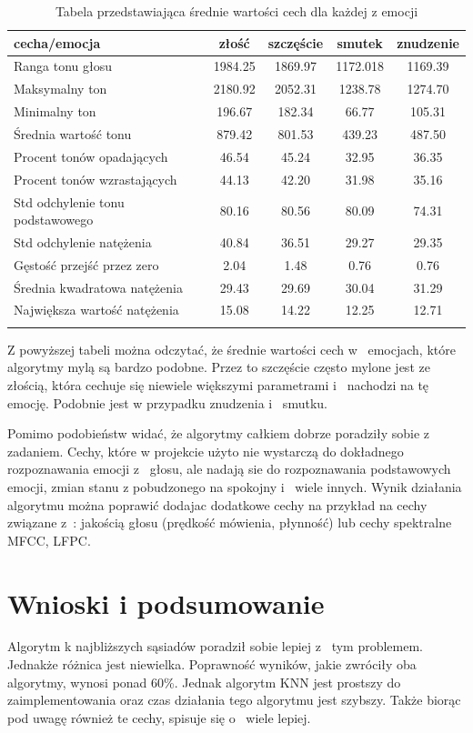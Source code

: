 \documentclass[declaration,shortabstract]{iithesis}
\begin{document}
\begin{table}[p]
\caption{Tabela przedstawiająca średnie wartości cech dla każdej z emocji}
  \begin{tabular}{|l|c|c|c|c|}
    \hline
    cecha/emocja & złość & szczęście & smutek & znudzenie \\ \hline
    Ranga tonu głosu & 1984.25 & 1869.97 & 1172.018 & 1169.39 \\ \hline
    Maksymalny ton & 2180.92 & 2052.31 & 1238.78 & 1274.70\\ \hline
    Minimalny ton & 196.67 & 182.34 & 66.77 & 105.31 \\ \hline
    Średnia wartość tonu & 879.42 & 801.53 & 439.23 & 487.50\\ \hline
	Procent tonów opadających & 46.54 & 45.24 & 32.95 & 36.35 \\ \hline
	Procent tonów wzrastających & 44.13 & 42.20 & 31.98 & 35.16 \\ \hline
	Std odchylenie tonu podstawowego & 80.16 & 80.56 & 80.09 & 74.31 \\ \hline
	Std odchylenie natężenia & 40.84 & 36.51 & 29.27 & 29.35 \\ \hline
	Gęstość przejść przez zero & 2.04 & 1.48 & 0.76 & 0.76 \\ \hline
	Średnia kwadratowa natężenia & 29.43 & 29.69 & 30.04 & 31.29 \\ \hline
	Największa wartość natężenia & 15.08 & 14.22 & 12.25 & 12.71 \\ \hline
	\label{sr_war}
  \end{tabular}
\end{table}

Z powyższej tabeli można odczytać, że średnie wartości cech w~ emocjach, które algorytmy mylą są bardzo podobne. Przez to szczęście często mylone jest ze złością, która cechuje się niewiele większymi parametrami i~ nachodzi na tę emocję. Podobnie jest w przypadku znudzenia i~ smutku. 

Pomimo podobieństw widać, że algorytmy całkiem dobrze poradziły sobie z zadaniem. Cechy, które w projekcie użyto nie wystarczą do dokładnego rozpoznawania emocji z~ głosu, ale nadają sie do rozpoznawania podstawowych emocji, zmian stanu z pobudzonego na spokojny i~ wiele innych. Wynik działania algorytmu można poprawić dodajac dodatkowe cechy na przykład na cechy związane z~: jakością głosu (prędkość mówienia, płynność) lub cechy spektralne MFCC, LFPC. 

\chapter{Wnioski i podsumowanie}
Algorytm k najbliższych sąsiadów poradził sobie lepiej z~ tym problemem. Jednakże różnica jest niewielka. Poprawność wyników, jakie zwróciły oba algorytmy, wynosi ponad 60\%. Jednak algorytm KNN jest prostszy do zaimplementowania oraz czas działania tego algorytmu jest szybszy. Także biorąc pod uwagę również te cechy, spisuje się o~ wiele lepiej.
\end{document}
